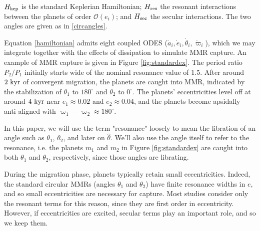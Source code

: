 \documentclass{mnras}
\renewcommand{\O}{\mathcal{O}}
\begin{document}
\(H_{\rm kep}\) is the standard Keplerian Hamiltonian; \(H_{\rm res}\)
the resonant interactions between the planets of order
\(\O(e_i)\); and \(H_{\rm sec}\) the secular interactions.
The two angles are given as in \eqref{circangles}.

Equation \eqref{hamiltonian} admits eight coupled ODES (\(\dot a_i, \dot
e_i, \dot\theta_i, \dot\varpi_i\)), which we may integrate together
with the effects of dissipation to simulate MMR capture.  An example
of MMR capture is given in Figure \ref{fig:standardex}.  The period
ratio \(P_2/P_1\) initially starts wide of the nominal resonance value
of \(1.5\).  After around \(2~\rm{kyr}\) of convergent migration, the
planets are caught into MMR, indicated by the stabilization of
\(\theta_1\) to \(180^\circ\) and \(\theta_2\) to \(0^\circ\).  The planets'
eccentricities level off at around \(4~\rm{kyr}\) near \(e_1\approx 0.02\)
and \(e_2\approx0.04\), and the planets become apsidally anti-aligned
with \(\varpi_1-\varpi_2\approx 180^\circ\).

In this paper, we will use the term "resonance" loosely to mean the
libration of an angle such as \(\theta_1\), \(\theta_2\), and later on
\(\hat\theta\).  We'll also use the angle itself to refer to the
resonance, i.e. the planets \(m_1\) and \(m_2\) in Figure
\ref{fig:standardex} are caught into both \(\theta_1\) and \(\theta_2\),
respectively, since those angles are librating.

During the migration phase, planets typically retain small
eccentricities. Indeed, the standard circular MMRs (angles \(\theta_1\)
and \(\theta_2\)) have finite resonance widths in \(e\), and so small
eccentricities are necessary for capture.  Most studies consider only
the resonant terms for this reason, since they are first order in
eccentricity.  However, if eccentricities are excited, secular terms
play an important role, and so we keep them.
\end{document}
